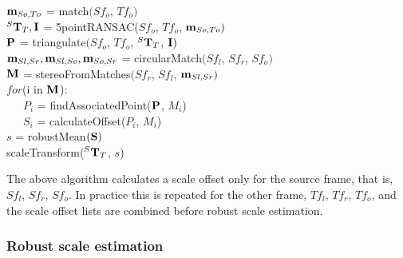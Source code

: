 \begin{algorithm}[h!]
 $\mathbf{m}_{So, To}$ = match$(Sf_o$, $Tf_o)$ \\ 
\vspace{0.3em}
 $^S \mathbf{T}_T, \mathbf{I}$ = 5pointRANSAC($Sf_o$, $Tf_o$, $\mathbf{m}_{So, To})$ \\
\vspace{0.3em}
 $\mathbf{P}$ = triangulate$(Sf_o$, $Tf_o$, $^S \mathbf{T}_T$, $\mathbf{I})$\\
\vspace{0.3em}
 $\mathbf m_{Sl,Sr},\mathbf m_{Sl,So},\mathbf m_{So,Sr}$ = circularMatch$(Sf_{l}$, $Sf_r$, $Sf_o)$ \\
\vspace{0.3em}
 $\mathbf{M}$ = stereoFromMatches$(Sf_r$, $Sf_l$, $\mathbf m_{Sl, Sr})$ \\
\vspace{0.3em}
 $for$(i in $\mathbf{M}$): \\
\vspace{0.3em}
 \ \ \ $P_i$ = findAssociatedPoint($\mathbf{P}$, ${M}_i$) \\
\vspace{0.3em}
 \ \ \ ${S}_i$ = calculateOffset(${P}_i$, ${M}_i$) \\
\vspace{0.3em}
 $s$ = robustMean$(\mathbf{S})$ \\
\vspace{0.3em}
 scaleTransform($^S \mathbf{T}_T$, $s$) \\
\vspace{0.3em}
\hspace{1em} 
\end{algorithm}

The above algorithm calculates a scale offset only for the source frame, that is, $Sf_{l}$, $Sf_r$, $Sf_o$.  In practice this is repeated for the other frame, $Tf_{l}$, $Tf_r$, $Tf_o$, and the scale offset lists are combined before robust scale estimation.


\subsubsection{Robust scale estimation}

